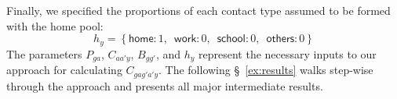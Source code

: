 \par
Finally, we specified the proportions of each contact type assumed to be formed with the home pool:
\begin{equation}
  h_y = \left\{
  \textsf{home}:   1,\enspace
  \textsf{work}:   0,\enspace
  \textsf{school}: 0,\enspace
  \textsf{others}: 0 \right\}
\end{equation}
The parameters $P_{ga}$, $C_{aa'y}$, $B_{gg'}$, and $h_y$ represent
the necessary inputs to our approach for calculating $C_{gag'a'y}$.
The following \S~\ref{ex:results} walks step-wise through the approach
and presents all major intermediate results.
\clearpage %
